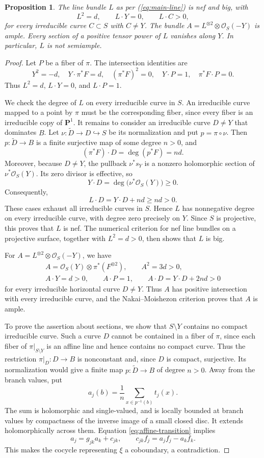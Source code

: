 \documentclass[11pt]{amsart}
\newtheorem{proposition}[theorem]{Proposition}
\theoremstyle{definition}
\theoremstyle{remark}
\numberwithin{equation}{section}
\newcommand{\PP}{\mathbf P}
\newcommand{\OO}{\mathcal O}
\begin{document}
\begin{proposition}\label{prop:ruled-geometry}
The line bundle $L$ as per \textup{(\ref{eq:main-line})} is nef and big, with
\[
 L^2=d,\qquad L\cdot Y=0,\qquad
 L\cdot C>0,
\]
for every irreducible curve $C\subset S$ with $C\neq Y $. The bundle $A=L^{\otimes2}\otimes\OO_S(-Y)$ is ample.
Every section of a positive tensor power of $L$ vanishes along $Y$.
In particular, $L$ is not semiample.
\end{proposition}
\begin{proof}
Let $P$ be a fiber of $\pi$. The intersection identities are
\[
 Y^2=-d,\quad Y\cdot\pi^*F=d,\quad (\pi^*F)^2=0,
 \quad Y\cdot P=1,\quad \pi^*F\cdot P=0.
\]
Thus $L^2=d$, $L\cdot Y=0$, and $L\cdot P=1$.

We check the degree of $L$ on every irreducible curve in $S$.
An irreducible curve mapped to a point by $\pi$ must be the
corresponding fiber, since every fiber is an irreducible copy
of $\PP^1$. It remains to consider an irreducible curve
$D\neq Y$ that dominates $B$. Let
$\nu:\widetilde D\to D\hookrightarrow S$ be its normalization
and put $p=\pi\circ\nu$. Then $p:\widetilde D\to B$ is a
finite surjective map of some degree $n>0$, and
\[
 (\pi^*F)\cdot D=\deg(p^*F)=nd.
\]
Moreover, because $D\neq Y$, the pullback $\nu^*s_Y$ is a
nonzero holomorphic section of $\nu^*\OO_S(Y)$. Its zero
divisor is effective, so
\[
 Y\cdot D=\deg\bigl(\nu^*\OO_S(Y)\bigr)\ge0.
\]
Consequently,
\[
 L\cdot D=Y\cdot D+nd\ge nd>0.
\]
These cases exhaust all irreducible curves in $S$. Hence
$L$ has nonnegative degree on every irreducible curve, with
degree zero precisely on $Y$. Since $S$ is projective, this
proves that $L$ is nef. The numerical criterion for nef line
bundles on a projective surface, together with $L^2=d>0$,
then shows that $L$ is big.

For $A=L^{\otimes2}\otimes\OO_S(-Y)$, we have
\[
 \begin{gathered}
 A=\OO_S(Y)\otimes\pi^*(F^{\otimes2}),\qquad A^2=3d>0,\\
 A\cdot Y=d>0,\qquad A\cdot P=1,\qquad
 A\cdot D=Y\cdot D+2nd>0
 \end{gathered}
\]
for every irreducible horizontal curve $D\neq Y$.
Thus $A$ has positive intersection with every irreducible
curve, and the Nakai--Moishezon criterion proves that $A$
is ample.

To prove the assertion about sections, we show that $S\setminus Y$
contains no compact irreducible curve. Such a curve $D$ cannot be contained in a fiber of $\pi$, since
each fiber of $\pi|_{S\setminus Y}$ is an affine line and hence
contains no compact curve. Thus the restriction $\pi|_D:D\to B$
is nonconstant and, since $D$ is compact, surjective. Its normalization would give a finite map $p:\widetilde D\to B$
of degree $n>0$. Away from the branch values,
put
\[
 a_j(b)=\frac1n\sum_{x\in p^{-1}(b)}t_j(x).
\]
The sum is holomorphic and single-valued, and is locally bounded
at branch values by compactness of the inverse image of a small
closed disc. It extends holomorphically across them. Equation
\eqref{eq:affine-transition} implies
\[
 a_j=g_{jk}a_k+c_{jk},\qquad
 c_{jk}f_j=a_jf_j-a_kf_k.
\]
This makes the cocycle representing $\xi$ a coboundary, a
contradiction.


\end{proof}
\end{document}
